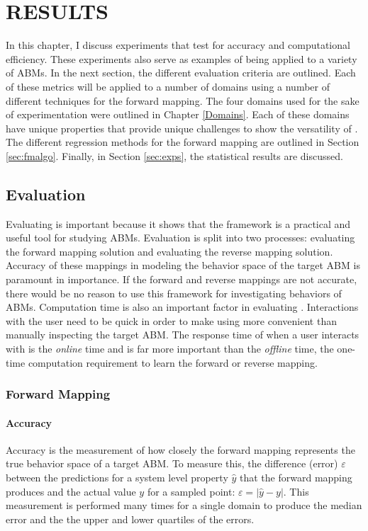 \chapter{RESULTS}
\thispagestyle{plain}

\label{Results}

In this chapter, I discuss experiments that test \fw for accuracy and computational efficiency.
These experiments also serve as examples of \fw being applied to a variety of ABMs.
In the next section, the different evaluation criteria are outlined.
Each of these metrics will be applied to a number of domains using a number of different techniques for the forward mapping.
The four domains used for the sake of experimentation were outlined in Chapter \ref{Domains}.
Each of these domains have unique properties that provide unique challenges to show the versatility of \fw.
The different regression methods for the forward mapping are outlined in Section \ref{sec:fmalgo}.
Finally, in Section \ref{sec:exps}, the statistical results are discussed.

\section{Evaluation}

Evaluating \fw is important because it shows that the framework is a practical and useful tool for studying ABMs.
Evaluation is split into two processes: evaluating the forward mapping solution and evaluating the reverse mapping solution.
Accuracy of these mappings in modeling the behavior space of the target ABM is paramount in importance.
If the forward and reverse mappings are not accurate, there would be no reason to use this framework for investigating behaviors of ABMs.
Computation time is also an important factor in evaluating \fw.
Interactions with the user need to be quick in order to make using \fw more convenient than manually inspecting the target ABM.
The response time of when a user interacts with \fw is the \textit{online} time and is far more important than the \textit{offline} time, the one-time computation requirement to learn the forward or reverse mapping.


 \subsection{Forward Mapping}

  \subsubsection{Accuracy}
Accuracy is the measurement of how closely the forward mapping represents the true behavior space of a target ABM.
To measure this, the difference (error) $\varepsilon$ between the predictions for a system level property $\hat y$ that the forward mapping produces and the actual value $y$ for a sampled point: $\varepsilon = |\hat y - y|$.
This measurement is performed many times for a single domain to produce the median error and the the upper and lower quartiles of the errors.


